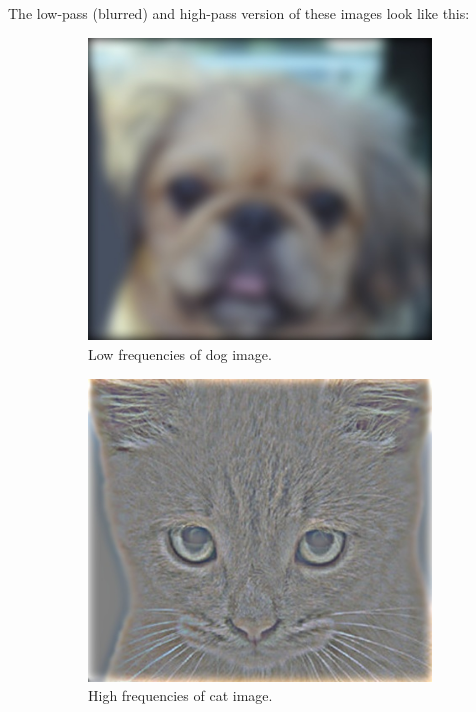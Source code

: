 \documentclass{article}
\begin{document}
\noindent
The low-pass (blurred) and high-pass version of these images look like this:

 \begin{figure}[ht]
      \centering
      \begin{subfigure}[b]{0.4\textwidth}
          \centering
          \includegraphics[width=\linewidth]{images/low_frequencies.jpg}
          \caption{Low frequencies of dog image.}
          \label{fig:low}
      \end{subfigure}
      \quad \quad
      \begin{subfigure}[b]{0.4\textwidth}
          \centering
          \includegraphics[width=\linewidth]{images/high_frequencies.jpg}
          \caption{High frequencies of cat image.}
          \label{fig:high}
      \end{subfigure}
      \caption{}
      \label{fig:low-high}
\end{figure}
\end{document}
